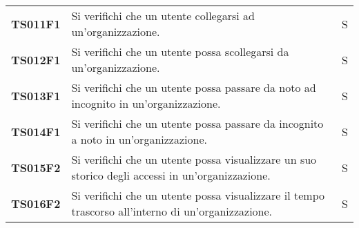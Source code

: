 \documentclass[../../piano-di-qualifica.tex]{subfiles}
\begin{document}
\begin{longtable}[H]{>{\centering\bfseries}m{3cm} >{}m{10cm} >{\centering\arraybackslash}m{3cm}}
  TS011F1            & Si verifichi che un utente collegarsi ad un'organizzazione.
                     & S                                                                                                                                                                                                                                                   \\

  TS012F1            & Si verifichi che un utente possa scollegarsi da un'organizzazione.
                     & S                                                                                                                                                                                                                                                   \\

  TS013F1            & Si verifichi che un utente possa passare da noto ad incognito in un'organizzazione.
                     & S                                                                                                                                                                                                                                                   \\

  TS014F1            & Si verifichi che un utente possa passare da incognito a noto in un'organizzazione.
                     & S                                                                                                                                                                                                                                                   \\

  TS015F2            & Si verifichi che un utente possa visualizzare un suo storico degli accessi in un'organizzazione.
                     & S                                                                                                                                                                                                                                                  \\

  TS016F2            & Si verifichi che un utente possa visualizzare il tempo trascorso all'interno di un'organizzazione.
                     & S                                                                                                                                                                                                                                                  \\


\end{longtable}
\end{document}
